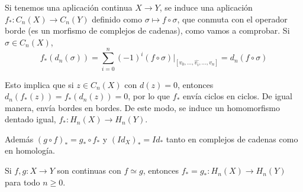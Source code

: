 \documentclass[TA.tex]{subfiles}
\begin{document}
Si tenemos una aplicación continua $X\to Y$, se induce una aplicación $f_*: C_n(X)\to C_n(Y)$ definido como $\sigma\mapsto f\circ\sigma$, que conmuta con el operador borde (es un morfismo de complejos de cadenas), como vamos a comprobar.  Si $\sigma\in C_n(X)$, 
\[
f_*(d_n(\sigma))=\sum_{i=0}^n (-1)^i (f\circ\sigma)|_{[v_0,\dots, \hat{v_i}, \dots, v_n]}=d_n(f\circ\sigma)
\]

Esto implica que si $z\in C_n(X)$ con $d(z)=0$, entonces $d_n(f_*(z))=f_*(d_n(z))=0$, por lo que $f_*$ envía ciclos en ciclos. De igual manera, envía bordes en bordes. De este modo, se induce un homomorfismo dentado igual, $f_*:H_n(X)\to H_n(Y)$. 

Además $(g\circ f)_*=g_*\circ f_*$ y $(Id_X)_*=Id_*$ tanto en complejos de cadenas como en homología.


\begin{teorema}
Si $f,g:X\to Y$ son continuas con $f\simeq g$, entonces $f_*=g_*:H_n(X)\to H_n(Y)$ para todo $n\geq 0$. 
\end{teorema}\
 \opencutright
\end{document}
